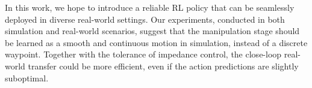 In this work, we hope to introduce a reliable RL policy that can be seamlessly deployed in diverse real-world settings. Our experiments, conducted in both simulation and real-world scenarios, suggest that the manipulation stage should be learned as a smooth and continuous motion in simulation, instead of a discrete waypoint. Together with the tolerance of impedance control, the close-loop real-world transfer could be more efficient, even if the action predictions are slightly suboptimal. %